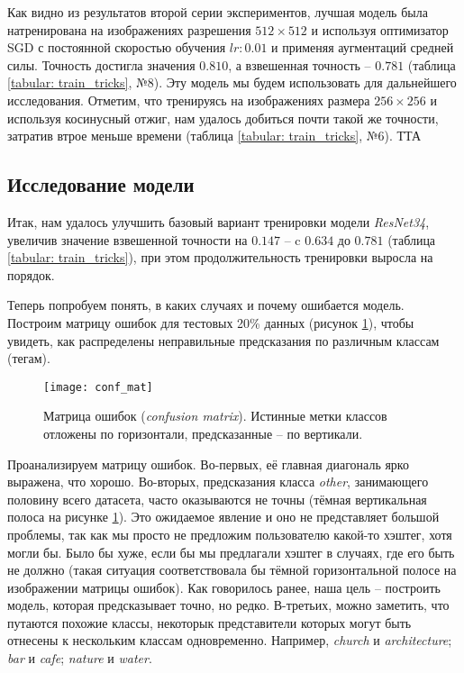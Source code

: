 \indent
\indent
Как видно из результатов второй серии экспериментов, лучшая модель
была натренирована на изображениях разрешения
$512 \times 512$ и используя
оптимизатор SGD с постоянной скоростью обучения $lr: 0.01$ и применяя
аугментаций средней силы. Точность достигла значения $0.810$, а
взвешенная точность -- $0.781$ (таблица \ref{tabular: train_tricks}, $№8$).
Эту модель мы будем использовать для дальнейшего исследования.
Отметим, что тренируясь на изображениях размера $256 \times 256$ и 
используя косинусный отжиг, нам удалось добиться почти такой же точности,
затратив втрое меньше времени (таблица \ref{tabular: train_tricks}, $№6$).
ТТА



\subsection{Исследование модели}


\indent
\indent
Итак, нам удалось улучшить базовый
вариант тренировки модели \textit{ResNet34},
увеличив значение взвешенной точности на $0.147$ -- 
 c $0.634$ до $0.781$ (таблица \ref{tabular: train_tricks}), 
при этом продолжительность 
тренировки выросла на порядок.


\indent
\indent
Теперь попробуем понять, в каких случаях и почему
 ошибается модель. Построим матрицу ошибок
 для тестовых 20\% данных
(рисунок \ref{tikzpicture: conf_mat}),
чтобы увидеть,  как распределены неправильные
предсказания по различным классам (тегам).


\begin{figure}[h!]
    \begin{center}
   	    \texttt{[image: conf\_mat]}
   	\end{center}
   	\caption{Матрица ошибок (\textit{confusion matrix}). Истинные метки 
   	               классов отложены по горизонтали, предсказанные -- по вертикали.}
   	\label{tikzpicture: conf_mat}
\end{figure}


\indent
\indent
Проанализируем матрицу ошибок.
Во-первых, её главная диагональ ярко выражена, что хорошо.
Во-вторых, предсказания класса \textit{other},
занимающего половину всего датасета, часто оказываются не 
точны (тёмная вертикальная полоса на рисунке \ref{tikzpicture: conf_mat}).
Это ожидаемое явление и оно не представляет большой проблемы, так как
мы просто не предложим пользователю какой-то хэштег, хотя могли бы.
Было бы хуже, если бы мы предлагали хэштег в случаях, где его 
быть не должно (такая ситуация соответствовала бы тёмной горизонтальной 
полосе на изображении матрицы ошибок).
Как говорилось ранее, наша цель -- построить модель, которая
предсказывает точно, но редко.
В-третьих, можно заметить, что путаются похожие классы, 
некоторык представители
которых могут быть отнесены к нескольким классам одновременно.
Например, \textit{church} и \textit{architecture}; \textit{bar} и \textit{cafe};
\textit{nature} и \textit{water}.


